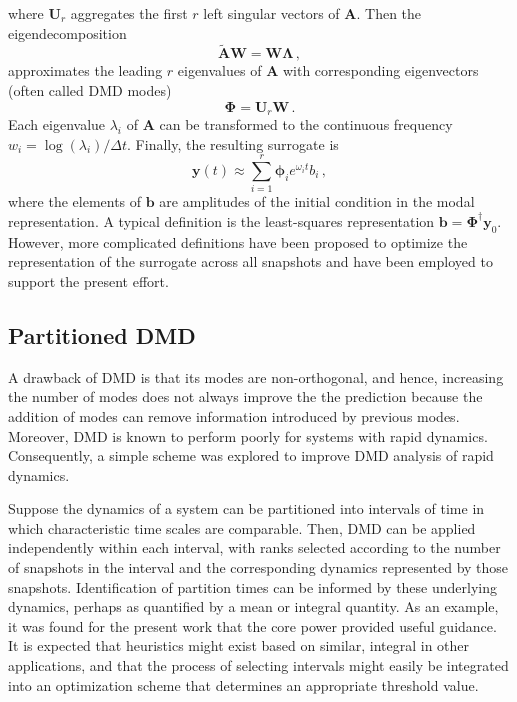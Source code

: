 \documentclass{anstrans}
\renewcommand{\vec}[1]{\bm{#1}} %
\begin{document}
where $\mathbf{U}_r$ aggregates the first $r$  left singular vectors of $\mathbf{A}$.  Then the eigendecomposition
\begin{equation}
 \mathbf{\tilde{A}}\mathbf{W} = \mathbf{W}\bm{\Lambda} \, ,
\end{equation}
approximates the leading $r$ eigenvalues of $\mathbf{A}$ with corresponding 
eigenvectors (often called DMD modes)
\begin{equation}
 \bm{\Phi} = \mathbf{U}_r \mathbf{W} \, .
\end{equation}
Each eigenvalue $\lambda_i$ of $\mathbf{A}$ can be transformed to the continuous frequency $w_i=\log(\lambda_i)/\Delta t$.
Finally, the resulting surrogate is
\begin{equation}
 \mathbf{y}(t) \approx \sum^r_{i=1} \bm{\phi}_i e^{\omega_i t} b_i \, ,
\end{equation}
where the elements of $\mathbf{b}$ are amplitudes of the initial condition in the modal representation.  A typical definition is 
the least-squares representation $\mathbf{b}=\bm{\Phi}^{\dagger} \mathbf{y}_0$.  However, more complicated definitions have been proposed to optimize the representation of the surrogate across all snapshots \cite{jovanovic2014sparsity} and have been employed to support the present effort.



\subsection{Partitioned DMD}


A drawback of DMD is that its modes are non-orthogonal, and hence, increasing the number of modes does not always improve the the prediction because the addition of modes can remove information introduced by previous modes.
Moreover, DMD is known to perform poorly for systems with rapid dynamics.  
Consequently, a simple scheme was explored to improve DMD analysis of rapid dynamics.

Suppose the dynamics of a system can be partitioned into intervals of time in which characteristic time scales are comparable.
Then, DMD can be applied independently within each interval, with ranks selected according to the number of snapshots in the interval and the corresponding dynamics represented by those snapshots.
Identification of partition times can be informed by these underlying dynamics, perhaps as quantified by a mean or integral quantity. 
As an example, it was found for the present work that the core power provided useful guidance.
It is expected that heuristics might exist based on similar, integral in other applications, and that the process of selecting intervals might easily be integrated into an optimization scheme that determines an appropriate threshold value.
\end{document}
